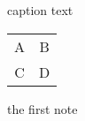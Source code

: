 \documentclass{article}
\begin{document}
\begin{threeparttable}
\caption{caption text}
\begin{tabular}{cc}
A\tnote{1} & B \\
C & D
\end{tabular}
\begin{tablenotes}
\item the first note
\end{tablenotes}
\end{threeparttable}
\end{document}
